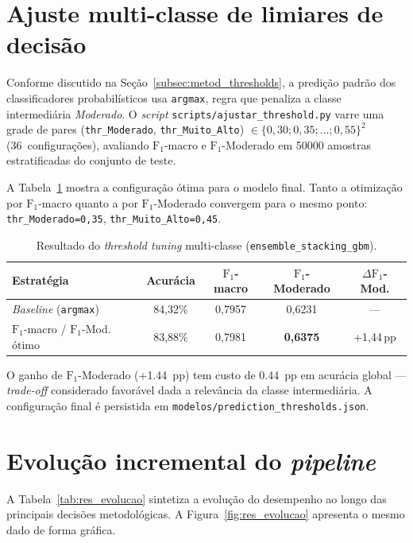 \section{Ajuste multi-classe de limiares de decisão}
\label{sec:res_threshold}

Conforme discutido na Seção~\ref{subsec:metod_thresholds}, a predição padrão dos classificadores probabilísticos usa \texttt{argmax}, regra que penaliza a classe intermediária \emph{Moderado}. O \emph{script} \texttt{scripts/ajustar\_threshold.py} varre uma grade de pares (\texttt{thr\_Moderado}, \texttt{thr\_Muito\_Alto}) \(\in \{0{,}30; 0{,}35; \ldots; 0{,}55\}^2\) (36~configurações), avaliando \(\text{F}_1\)-macro e \(\text{F}_1\)-Moderado em \num{50000} amostras estratificadas do conjunto de teste.

A Tabela~\ref{tab:res_threshold} mostra a configuração ótima para o modelo final. Tanto a otimização por \(\text{F}_1\)-macro quanto a por \(\text{F}_1\)-Moderado convergem para o mesmo ponto: \texttt{thr\_Moderado=0,35}, \texttt{thr\_Muito\_Alto=0,45}.

\begin{table}[h]
\centering
\caption{Resultado do \emph{threshold tuning} multi-classe (\texttt{ensemble\_stacking\_gbm}).}
\label{tab:res_threshold}
\begin{tabular}{lcccc}
\toprule
\textbf{Estratégia} & \textbf{Acurácia} & \textbf{$\text{F}_1$-macro} & \textbf{$\text{F}_1$-Moderado} & \textbf{$\Delta \text{F}_1$-Mod.} \\
\midrule
\emph{Baseline} (\texttt{argmax})    & 84,32\% & 0,7957 & 0,6231 & --- \\
$\text{F}_1$-macro / $\text{F}_1$-Mod. ótimo & 83,88\% & 0,7981 & \textbf{0,6375} & +1,44\,pp \\
\bottomrule
\end{tabular}
\end{table}

O ganho de \(\text{F}_1\)-Moderado (+\SI{1,44}{pp}) tem custo de \SI{0,44}{pp} em acurácia global --- \emph{trade-off} considerado favorável dada a relevância da classe intermediária. A configuração final é persistida em \texttt{modelos/prediction\_thresholds.json}.

\section{Evolução incremental do \emph{pipeline}}
\label{sec:res_evolucao}

A Tabela~\ref{tab:res_evolucao} sintetiza a evolução do desempenho ao longo das principais decisões metodológicas. A Figura~\ref{fig:res_evolucao} apresenta o mesmo dado de forma gráfica.

